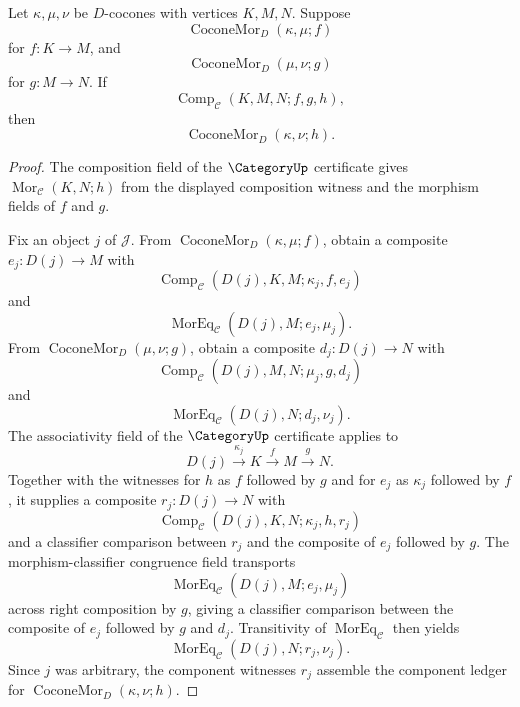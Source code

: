 \begin{lemma}\label{lem:catcolimit-cocone-morphism-composite-closure}
Let $\kappa,\mu,\nu$ be $D$-cocones with vertices $K,M,N$. Suppose
$$
\operatorname{CoconeMor}_{D}(\kappa,\mu;f)
$$
for $f:K\to M$, and
$$
\operatorname{CoconeMor}_{D}(\mu,\nu;g)
$$
for $g:M\to N$. If
$$
\operatorname{Comp}_{\mathcal C}(K,M,N;f,g,h),
$$
then
$$
\operatorname{CoconeMor}_{D}(\kappa,\nu;h).
$$
\end{lemma}
\begin{proof}
The composition field of the $\CategoryUp$ certificate gives $\operatorname{Mor}_{\mathcal C}(K,N;h)$ from the displayed composition witness and the morphism fields of $f$ and $g$.

Fix an object $j$ of $\mathcal J$. From $\operatorname{CoconeMor}_{D}(\kappa,\mu;f)$, obtain a composite $e_j:D(j)\to M$ with
$$
\operatorname{Comp}_{\mathcal C}(D(j),K,M;\kappa_j,f,e_j)
$$
and
$$
\operatorname{MorEq}_{\mathcal C}(D(j),M;e_j,\mu_j).
$$
From $\operatorname{CoconeMor}_{D}(\mu,\nu;g)$, obtain a composite $d_j:D(j)\to N$ with
$$
\operatorname{Comp}_{\mathcal C}(D(j),M,N;\mu_j,g,d_j)
$$
and
$$
\operatorname{MorEq}_{\mathcal C}(D(j),N;d_j,\nu_j).
$$
The associativity field of the $\CategoryUp$ certificate applies to
$$
D(j)\xrightarrow{\kappa_j}K\xrightarrow{f}M\xrightarrow{g}N.
$$
Together with the witnesses for $h$ as $f$ followed by $g$ and for $e_j$ as $\kappa_j$ followed by $f$, it supplies a composite $r_j:D(j)\to N$ with
$$
\operatorname{Comp}_{\mathcal C}(D(j),K,N;\kappa_j,h,r_j)
$$
and a classifier comparison between $r_j$ and the composite of $e_j$ followed by $g$. The morphism-classifier congruence field transports
$$
\operatorname{MorEq}_{\mathcal C}(D(j),M;e_j,\mu_j)
$$
across right composition by $g$, giving a classifier comparison between the composite of $e_j$ followed by $g$ and $d_j$. Transitivity of $\operatorname{MorEq}_{\mathcal C}$ then yields
$$
\operatorname{MorEq}_{\mathcal C}(D(j),N;r_j,\nu_j).
$$
Since $j$ was arbitrary, the component witnesses $r_j$ assemble the component ledger for $\operatorname{CoconeMor}_{D}(\kappa,\nu;h)$.
\end{proof}


